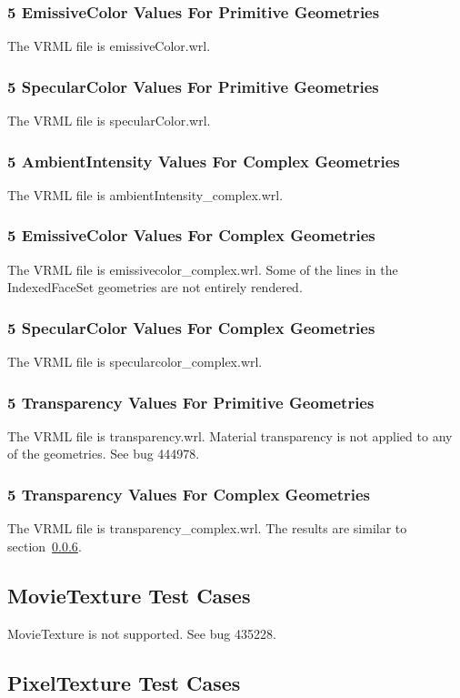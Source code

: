 \documentclass[12pt,letterpaper]{article}
\newcommand{\MatW}{5 EmissiveColor Values For Primitive Geometries}
\newcommand{\MatX}{5 SpecularColor Values For Primitive Geometries}
\newcommand{\MatY}{5 AmbientIntensity Values For Complex Geometries}
\newcommand{\MatZ}{5 EmissiveColor Values For Complex Geometries}
\newcommand{\MatAA}{5 SpecularColor Values For Complex Geometries}
\newcommand{\MatAB}{5 Transparency Values For Primitive Geometries}
\newcommand{\MatAC}{5 Transparency Values For Complex Geometries}
\begin{document}
\subsubsection{\MatW}
\label{sec:mat-emissive}
The VRML file is emissiveColor.wrl.

\subsubsection{\MatX}
The VRML file is specularColor.wrl.

\subsubsection{\MatY}
\label{sec:amb-intensity-complex}
The VRML file is ambientIntensity\_complex.wrl.

\subsubsection{\MatZ}
The VRML file is emissivecolor\_complex.wrl.\newline
Some of the lines in the IndexedFaceSet geometries are not entirely rendered.

\subsubsection{\MatAA}
The VRML file is specularcolor\_complex.wrl.

\subsubsection{\MatAB}
\label{sec:mat-transparency}
The VRML file is transparency.wrl.\newline
Material transparency is not applied to any of the geometries.
See bug 444978.

\subsubsection{\MatAC}
The VRML file is transparency\_complex.wrl.\newline
The results are similar to section~\ref{sec:mat-transparency}.

\subsection{MovieTexture Test Cases}
MovieTexture is not supported.
See bug 435228.

\subsection{PixelTexture Test Cases}
\end{document}
